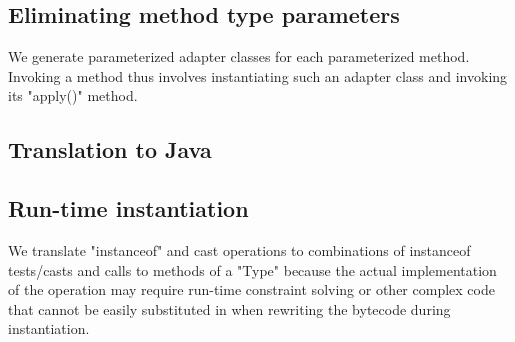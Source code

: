 \subsection{Eliminating method type parameters}

We generate parameterized adapter classes for each
parameterized method.  Invoking a method thus involves
instantiating such an adapter class and invoking its
\xcd"apply()" method.

\subsection{Translation to Java}

\subsection{Run-time instantiation}

We translate \xcd"instanceof" and cast operations to combinations
of instanceof tests/casts and calls to
methods of a \xcd"Type" because the actual implementation of
the operation may require run-time constraint solving or other
complex code that cannot be easily substituted in when rewriting
the bytecode during instantiation.
